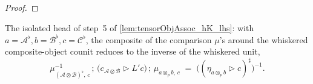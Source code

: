 \begin{proof}
\end{proof}

\begin{lemma}



  \label{lem:tensorObjAssoc_hK_lhs_head}
  The isolated head of step~5 of \cref{lem:tensorObjAssoc_hK_lhs}: with
  \(a=\mathcal{A}^{\flat}, b=\mathcal{B}^{\flat}, c=\mathcal{C}^{\flat}\), the composite of the
  comparison \(\mu\)'s around the whiskered composite-object counit reduces to the inverse of the
  whiskered unit,
  \[
    \mu_{(\mathcal{A}\otimes\mathcal{B})^{\flat},\,c}^{-1}\,;\,
      \bigl(c_{\mathcal{A}\otimes\mathcal{B}} \rhd L'c\bigr)\,;\,
      \mu_{a\otimes_p b,\,c}
    \;=\; \bigl((\eta_{a\otimes_p b} \rhd c)^{\sharp}\bigr)^{-1}.
  \]
\end{lemma}

